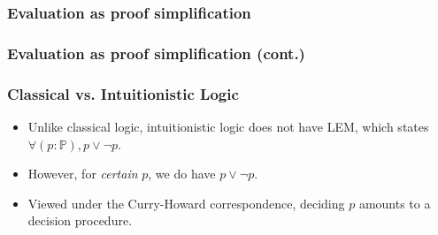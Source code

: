 \documentclass{beamer}
\begin{document}
\begin{frame}
\frametitle{Evaluation as proof simplification}

\begin{prooftree}
\end{prooftree}
\vspace{1cm}

\begin{prooftree}
\end{prooftree}
\end{frame}

\begin{frame}
\frametitle{Evaluation as proof simplification (cont.)}
\begin{prooftree}
\end{prooftree}
\vspace{1cm}
\begin{prooftree}
\end{prooftree}
\end{frame}

\begin{frame}
\frametitle{Classical vs. Intuitionistic Logic}
\begin{itemize}
\item Unlike classical logic, intuitionistic logic does not have LEM,
  which states $\forall (p : \mathbb{P}), p\vee\neg p$.
\item However, for \textit{certain} $p$, we do have $p\vee\neg p$.
\item Viewed under the Curry-Howard correspondence, deciding $p$
  amounts to a decision procedure.
\end{itemize}
\end{frame}
\end{document}
